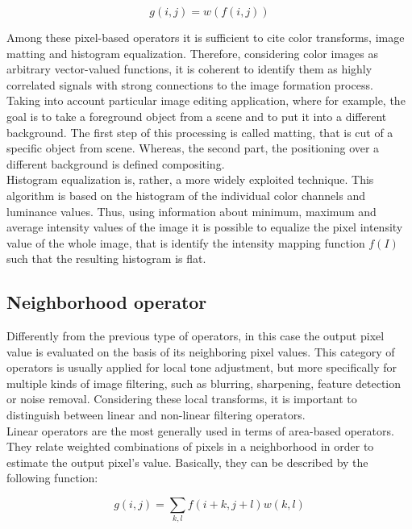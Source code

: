 \begin{equation}
	g(i, j) = w(f(i,j))
\end{equation}

Among these pixel-based operators it is sufficient to cite color transforms, image matting and histogram equalization. 
Therefore, considering color images as arbitrary vector-valued functions, it is coherent to identify them as highly correlated signals with strong connections to the image formation process. \\
Taking into account particular image editing application, where for example, the goal is to take a foreground object from a scene and to put it into a different background.
The first step of this processing is called matting, that is cut of a specific object from scene. 
Whereas, the second part, the positioning over a different background is defined compositing.\\
Histogram equalization is, rather, a more widely exploited technique. 
This algorithm is based on the histogram of the individual color channels and luminance values.
Thus, using information about minimum, maximum and average intensity values of the image it is possible to equalize the pixel intensity value of the whole image, that is identify the intensity mapping function $f(I)$ such that the resulting histogram is flat. 

\subsection{Neighborhood operator}
\label{subsection:neighbor-operator}

Differently from the previous type of operators, in this case the output pixel value is evaluated on the basis of its neighboring pixel values.
This category of operators is usually applied for local tone adjustment, but more specifically for multiple kinds of image filtering, such as blurring, sharpening, feature detection or noise removal.
Considering these local transforms, it is important to distinguish between linear and non-linear filtering operators.\\
Linear operators are the most generally used in terms of area-based operators. 
They relate weighted combinations of pixels in a neighborhood in order to estimate the output pixel's value. 
Basically, they can be described by the following function:

\begin{equation}
 \label{eqn:local-linear-oper}
 g(i, j) = \sum_{k,l} f(i + k, j + l)w(k, l)
\end{equation}


